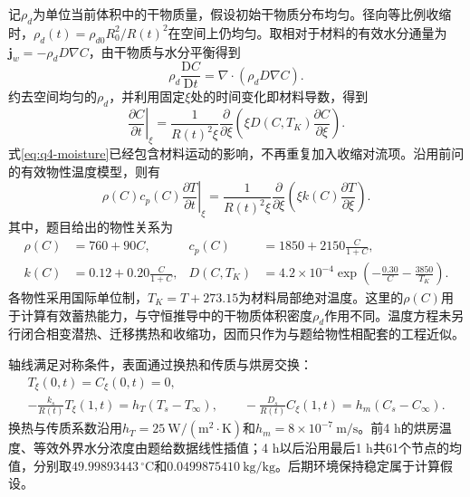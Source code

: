 记$\rho_d$为单位当前体积中的干物质量，假设初始干物质分布均匀。径向等比例收缩时，$\rho_d(t)=\rho_{d0}R_0^2/R(t)^2$在空间上仍均匀。取相对于材料的有效水分通量为$\boldsymbol j_w=-\rho_dD\nabla C$，由干物质与水分平衡得到
\begin{equation}
 \rho_d\frac{\mathrm D C}{\mathrm Dt}
 =\nabla\cdot(\rho_dD\nabla C).
 \label{eq:q4-drybalance}
\end{equation}
约去空间均匀的$\rho_d$，并利用固定$\xi$处的时间变化即材料导数，得到
\begin{equation}
 \left.\frac{\partial C}{\partial t}\right|_{\xi}
 =\frac{1}{R(t)^2\xi}\frac{\partial}{\partial\xi}
 \left(\xi D(C,T_K)\frac{\partial C}{\partial\xi}\right).
 \label{eq:q4-moisture}
\end{equation}
式\eqref{eq:q4-moisture}已经包含材料运动的影响，不再重复加入收缩对流项。沿用前问的有效物性温度模型，则有
\begin{equation}
 \rho(C)c_p(C)\left.\frac{\partial T}{\partial t}\right|_{\xi}
 =\frac{1}{R(t)^2\xi}\frac{\partial}{\partial\xi}
 \left(\xi k(C)\frac{\partial T}{\partial\xi}\right).
 \label{eq:q4-heat}
\end{equation}
其中，题目给出的物性关系为
\begin{equation}
 \begin{aligned}
 \rho(C)&=760+90C, & c_p(C)&=1850+2150\frac{C}{1+C},\\
 k(C)&=0.12+0.20\frac{C}{1+C},&
 D(C,T_K)&=4.2\times10^{-4}\exp\!\left(-\frac{0.30}{C}-\frac{3850}{T_K}\right).
 \end{aligned}
 \label{eq:q4-properties}
\end{equation}
各物性采用国际单位制，$T_K=T+273.15$为材料局部绝对温度。这里的$\rho(C)$用于计算有效蓄热能力，与守恒推导中的干物质体积密度$\rho_d$作用不同。温度方程未另行闭合相变潜热、迁移携热和收缩功，因而只作为与题给物性相配套的工程近似。

轴线满足对称条件，表面通过换热和传质与烘房交换：
\begin{equation}
 \begin{gathered}
 T_{\xi}(0,t)=C_{\xi}(0,t)=0,\\
 -\frac{k_s}{R(t)}T_{\xi}(1,t)=h_T(T_s-T_\infty),\qquad
 -\frac{D_s}{R(t)}C_{\xi}(1,t)=h_m(C_s-C_\infty).
 \end{gathered}
 \label{eq:q4-boundary}
\end{equation}
换热与传质系数沿用$h_T=25\ \mathrm{W/(m^2\cdot K)}$和$h_m=8\times10^{-7}\ \mathrm{m/s}$。前4 h的烘房温度、等效外界水分浓度由题给数据线性插值；4 h以后沿用最后1 h共61个节点的均值，分别取$49.99893443\,^{\circ}\mathrm C$和$0.0499875410\ \mathrm{kg/kg}$。后期环境保持稳定属于计算假设。


